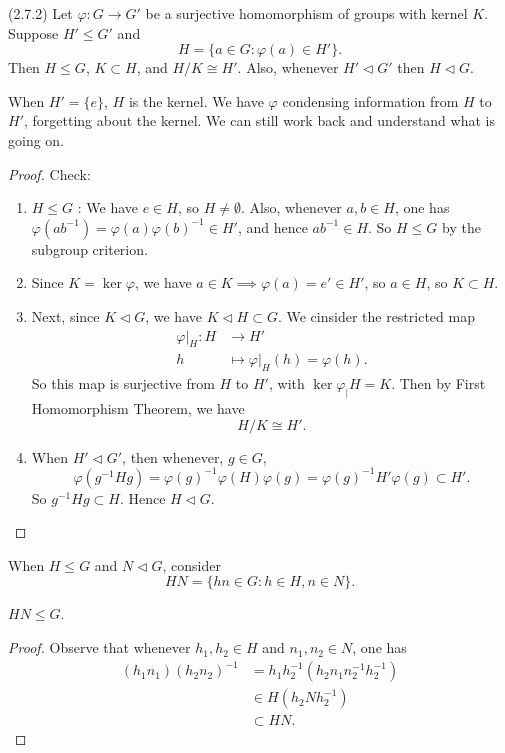 \begin{theorem}
	(2.7.2)
	Let $\varphi: G \to  G'$ be a surjective homomorphism of groups with kernel $K$. Suppose $H' \le G'$ and \[
		H = \{a \in G: \varphi(a) \in H'\} 
	.\] 
	Then $H \le G$, $K \subset H$, and $H / K \cong H'$. Also, whenever $H' \triangleleft G'$ then $H \triangleleft G$.
\end{theorem}
\begin{remark}
	When $H' = \{e\} $, $H$ is the kernel. We have $\varphi$ condensing information from $H$ to $H'$, forgetting about the kernel. We can still work back and understand what is going on.
\end{remark}
\begin{proof}
	Check: 
	\begin{enumerate}
		\item $H\le G$ :
		We have $e \in H$, so $H \neq  \emptyset $. Also, whenever $a, b \in H$, one has $\varphi(ab^{-1} ) = \varphi(a)\varphi(b)^{-1} \in H'$, and hence
		$ab^{-1} \in H$. So $H \le G$ by the subgroup criterion.
	\item Since  $K = \operatorname{ker} \varphi$, we have $a \in K \implies \varphi(a) = e' \in H'$, so $a \in H$, so $K \subset H$.
	\item Next, since $K \triangleleft G$, we have $K \triangleleft H \subset G$. We cinsider the restricted map
		\begin{align*}
			\varphi|_H: H &\longrightarrow H' \\
			h &\longmapsto \varphi|_H(h) = \varphi(h)
		.\end{align*}
	So this map is surjective from $H$ to $H'$, with $\operatorname{ker} \varphi_|H = K$. Then by First Homomorphism Theorem, we have \[
		H / K \cong H'
	.\] 
\item When $H'\triangleleft G'$, then whenever, $g \in G$, 
	\[
	\varphi(g^{-1} Hg) = \varphi(g)^{-1}\varphi(H)\varphi(g) = \varphi(g)^{-1}H'\varphi(g) \subset H'
.\] 
So $g^{-1} Hg \subset H$. Hence $H \triangleleft G$.
	\end{enumerate}
\end{proof}

When $H \le G$ and $N \triangleleft G$, consider \[
	H N = \{hn \in G: h \in H, n \in N\} 
.\] 
\begin{claim}
	$H N \le G $.
\end{claim}
\begin{proof}
	Observe that whenever $h_1, h_2 \in H$ and $n_1, n_2 \in N$, one has 
	\begin{align*}
		(h_1n_1)(h_2n_2)^{-1} 
		&= h_1h_2^{-1}(h_2n_1n_2^{-1}h_2^{-1})\\
		&\in H (h_2 N h_2^{-1})\\
		&\subset  H N
	.\end{align*} 
\end{proof}
